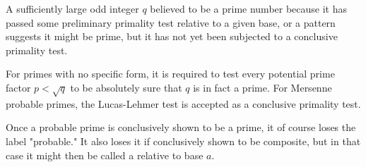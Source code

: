 \documentclass[12pt]{article}
\begin{document}
A sufficiently large odd integer $q$ believed to be a prime number because it has passed some preliminary primality test relative to a given base, or a pattern suggests it might be prime, but it has not yet been subjected to a conclusive primality test.

For primes with no specific form, it is required to test every potential prime factor $p < \sqrt{q}$ to be absolutely sure that $q$ is in fact a prime. For Mersenne probable primes, the Lucas-Lehmer test is accepted as a conclusive primality test.

Once a probable prime is conclusively shown to be a prime, it of course loses the label "probable." It also loses it if conclusively shown to be composite, but in that case it might then be called a  relative to base $a$.


\end{document}
